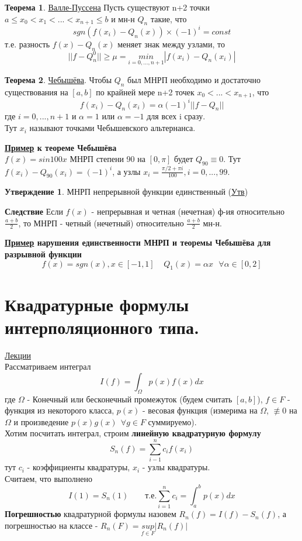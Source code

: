 \documentclass[specialist, subf, href, colorlinks=true, 12pt, times, mtpro, final]{disser}
\theoremstyle{definition}
\newtheorem{state}{Утверждение}[section]
\newtheorem{theorem}{Теорема}[section]
\begin{document}
	\begin{theorem}
		\hyperlink {lects.35}{Валле-Пуссена} Пусть существуют n+2 точки $a \le x_0 < x_1 < ... < x_{n+1} \le b$ и мн-н $Q_n$ такие, что 
		$$
			sgn(f(x_i) - Q_n(x)) \times (-1)^i = const
		$$
		т.е. разность $f(x) - Q_n(x)$ меняет знак между узлами, то
		$$
			||f-Q_n^0|| \ge \mu = \underset{i = 0, ..., n+1}{min} |f(x_i) - Q_n(x_i)|
		$$
	\end{theorem}
	\begin{theorem}
		\hyperlink {lects.35}{Чебышёва}. Чтобы $Q_n$ был МНРП необходимо и достаточно существования на $[a,b]$ по крайней мере n+2 точек $x_0 < ... < x_{n+1}$, что
		$$
			f(x_i) - Q_n(x_i) = \alpha (-1)^i ||f-Q_n||
		$$
		где $i = 0, ..., n+1$ и $\alpha = 1$ или $\alpha = -1$ для всех i сразу.\\
		Тут $x_i$ называют точками Чебышевского альтернанса.
	\end{theorem}

	\textbf{\hyperlink {lects.36}{Пример} к теореме Чебышёва}\\
	$f(x) = sin100x$ МНРП степени 90 на $[0,\pi]$ будет $Q_{90} \equiv 0$. Тут $f(x_i) - Q_{90}(x_i) = (-1)^i$, а узлы $x_i = \frac{\pi/2 +\pi i}{100}, i = 0, ... , 99$.
	
	\begin{state}
		МНРП непрерывной функции единственный (\hyperlink {lects.36}{Утв})
	\end{state}
	\textbf{Следствие} Если $f(x)$ - непрерывная и четная (нечетная) ф-ия относительно $\frac{a+b}{2}$, то МНРП - четный (нечетный) относительно $\frac{a+b}{2}$ мн-н.
	
	\textbf{\hyperlink {lects.36}{Пример} нарушения единственности МНРП и теоремы Чебышёва для разрывной функции}
	$$
		f(x) = sgn(x), x\in[-1,1] \ \ \ \ \ Q_1(x) = \alpha x \ \ \ \forall \alpha \in [0,2] 
	$$
	

\section {Квадратурные формулы интерполяционного типа.}
	\hyperlink {lects.37}{Лекции}\\
	Рассматриваем интеграл
	$$
		I(f) = \int_{\Omega}p(x)f(x)dx
	$$
	где $\Omega$ - Конечный или бесконечный промежуток (будем считать $[a,b]$), $f \in F$ - функция из некоторого класса, $p(x)$ - весовая функция (измерима на $\Omega$, $\not\equiv 0$ на $\Omega$ и произведение $p(x)g(x) \ \ \forall g \in F$ суммируемо). \\
	Хотим посчитать интеграл, строим \textbf{линейную квадратурную формулу}
	$$
		S_n(f) = \sum\limits_{i - 1}^{n} c_if(x_i)
	$$
	тут $c_i$ - коэффициенты квадратуры, $x_i$ - узлы квадратуры.\\
	Считаем, что выполнено 
	$$
		I(1) = S_n(1) \ \ \ \ \ \ \ \ \ \text{т.е.} \sum\limits_{i = 1}^n c_i = \int_a^b p(x) dx
	$$
	\textbf{Погрешностью} квадратурной формулы назовем $R_n(f) = I(f) - S_n(f)$, а погрешностью на классе - $R_n(F) = \underset{f\in F}{sup} |R_n(f)|$
	
\end{document}
